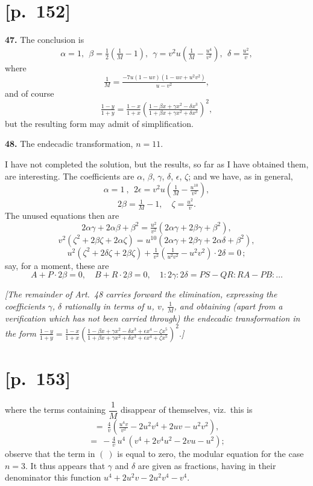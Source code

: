 \documentclass[11pt]{article}
\begin{document}
\section*{[p.~152]}
\noindent\textbf{47.} The conclusion is
\[
\alpha=1,\ \ \beta=\tfrac{1}{2}\!\left(\tfrac{1}{M}-1\right)\!,\ \ \gamma=v^2u\!\left(\tfrac{1}{M}-\tfrac{u^4}{v^2}\right)\!,\ \ \delta=\tfrac{u^2}{v},
\]
where
\[
\tfrac{1}{M}=\tfrac{-7u(1-uv)(1-uv+u^2v^2)}{u-v^2},
\]
and of course
\[
\tfrac{1-y}{1+y}=\tfrac{1-x}{1+x}\!\left(\tfrac{1-\beta x+\gamma x^2-\delta x^3}{1+\beta x+\gamma x^2+\delta x^3}\right)^{\!2}\!,
\]
but the resulting form may admit of simplification.

\medskip
\noindent\textbf{48.} The endecadic transformation, $n=11$.

I have not completed the solution, but the results, so far as I have obtained
them, are interesting. The coefficients are $\alpha$, $\beta$, $\gamma$, $\delta$, $\epsilon$, $\zeta$; and we have, as in general,
\[
\alpha=1\ ,\ \ 2\epsilon=v^2u\!\left(\tfrac{1}{M}-\tfrac{u^{10}}{v^2}\right)\!,
\]
\[
2\beta=\tfrac{1}{M}-1,\quad \zeta=\tfrac{u^2}{v}.
\]
The unused equations then are
\[
2\alpha\gamma+2\alpha\beta+\beta^2=\tfrac{u^2}{v^2}(2\alpha\gamma+2\beta\gamma+\beta^2),
\]
\[
v^2(\zeta^2+2\beta\zeta+2\alpha\zeta)=u^{10}(2\alpha\gamma+2\beta\gamma+2\alpha\delta+\beta^2),
\]
\[
u^2(\zeta^2+2\delta\zeta+2\beta\zeta)+\tfrac{1}{v^2}\!\left(\tfrac{1}{u^2v^2}-u^2v^2\right)\!\cdot 2\delta=0\,;
\]
say, for a moment, these are
\[
A+P\cdot 2\beta=0,\quad B+R\cdot 2\beta=0,\quad 1:2\gamma:2\delta=PS-QR:RA-PB:\ldots
\]

\medskip
\noindent\textit{[The remainder of Art.\ 48 carries forward the elimination, expressing the
coefficients $\gamma$, $\delta$ rationally in terms of $u$, $v$, $\tfrac{1}{M}$, and obtaining (apart from a
verification which has not been carried through) the endecadic transformation
in the form
$
\tfrac{1-y}{1+y}=\tfrac{1-x}{1+x}\!\left(\tfrac{1-\beta x+\gamma x^2-\delta x^3+\epsilon x^4-\zeta x^5}{1+\beta x+\gamma x^2+\delta x^3+\epsilon x^4+\zeta x^5}\right)^{\!2}\!.
$]}

\section*{[p.~153]}
where the terms containing $\dfrac{1}{M}$ disappear of themselves, viz.\ this is
\[
=\ \tfrac{4}{v}\!\left(\tfrac{u^4v}{v^2}-2u^2v^4+2uv-u^2v^2\right)\!,
\]
\[
=\ -\tfrac{4}{v}\,u^4\,(v^4+2v^4u^2-2vu-u^2);
\]
observe that the term in $(\ )$ is equal to zero, the modular equation for the
case $n=3$. It thus appears that $\gamma$ and $\delta$ are given as fractions, having in their
denominator this function $u^4+2u^2v-2u^2v^4-v^4$.
\end{document}
